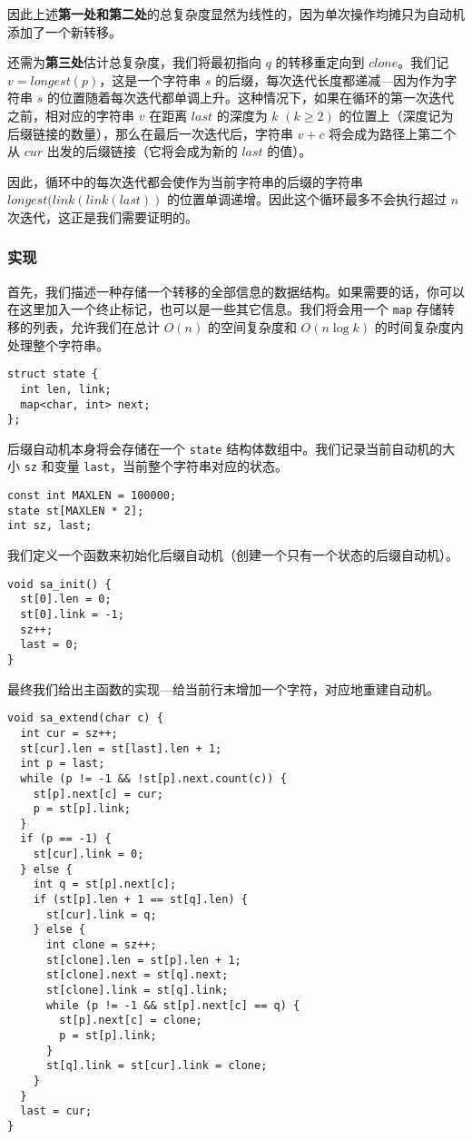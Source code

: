 因此上述\textbf{第一处和第二处}的总复杂度显然为线性的，因为单次操作均摊只为自动机添加了一个新转移。

还需为\textbf{第三处}估计总复杂度，我们将最初指向 \(q\) 的转移重定向到
\(clone\)。我们记 \(v=longest(p)\)，这是一个字符串 \(s\)
的后缀，每次迭代长度都递减---因为作为字符串 \(s\)
的位置随着每次迭代都单调上升。这种情况下，如果在循环的第一次迭代之前，相对应的字符串
\(v\) 在距离 \(last\) 的深度为 \(k\) \((k\ge2)\)
的位置上（深度记为后缀链接的数量），那么在最后一次迭代后，字符串 \(v+c\)
将会成为路径上第二个从 \(cur\) 出发的后缀链接（它将会成为新的 \(last\)
的值）。

因此，循环中的每次迭代都会使作为当前字符串的后缀的字符串
\(longest(link(link(last))\)
的位置单调递增。因此这个循环最多不会执行超过 \(n\)
次迭代，这正是我们需要证明的。

\subsubsection{实现}

首先，我们描述一种存储一个转移的全部信息的数据结构。如果需要的话，你可以在这里加入一个终止标记，也可以是一些其它信息。我们将会用一个
\texttt{map} 存储转移的列表，允许我们在总计 \(O(n)\) 的空间复杂度和
\(O(n\log k)\) 的时间复杂度内处理整个字符串。
\begin{verbatim}
struct state {
  int len, link;
  map<char, int> next;
};
\end{verbatim}

后缀自动机本身将会存储在一个 \texttt{state}
结构体数组中。我们记录当前自动机的大小 \texttt{sz} 和变量
\texttt{last}，当前整个字符串对应的状态。
\begin{verbatim}
const int MAXLEN = 100000;
state st[MAXLEN * 2];
int sz, last;
\end{verbatim}

我们定义一个函数来初始化后缀自动机（创建一个只有一个状态的后缀自动机）。
\begin{verbatim}
void sa_init() {
  st[0].len = 0;
  st[0].link = -1;
  sz++;
  last = 0;
}
\end{verbatim}

最终我们给出主函数的实现---给当前行末增加一个字符，对应地重建自动机。

\begin{verbatim}
void sa_extend(char c) {
  int cur = sz++;
  st[cur].len = st[last].len + 1;
  int p = last;
  while (p != -1 && !st[p].next.count(c)) {
    st[p].next[c] = cur;
    p = st[p].link;
  }
  if (p == -1) {
    st[cur].link = 0;
  } else {
    int q = st[p].next[c];
    if (st[p].len + 1 == st[q].len) {
      st[cur].link = q;
    } else {
      int clone = sz++;
      st[clone].len = st[p].len + 1;
      st[clone].next = st[q].next;
      st[clone].link = st[q].link;
      while (p != -1 && st[p].next[c] == q) {
        st[p].next[c] = clone;
        p = st[p].link;
      }
      st[q].link = st[cur].link = clone;
    }
  }
  last = cur;
}
\end{verbatim}

